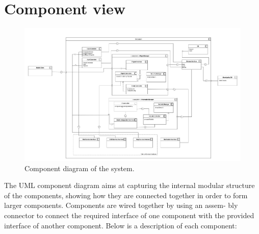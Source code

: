 \documentclass{report}
\begin{document}
\section{Component view}
\begin{figure}[!ht]
	\begin{center}
	\includegraphics[width=\textwidth]{img/ComponentDiagram1.png}
    \end{center}
    \label{fig:componentdiagram}
	\caption{Component diagram of the system.}
\end{figure}
The UML component diagram aims at capturing the internal modular structure of the components, showing how they are connected together in order to form larger components. Components are wired together by using an assem-
bly connector to connect the required interface of one component with the provided interface of another component.
Below is a description of each component:
\end{document}
